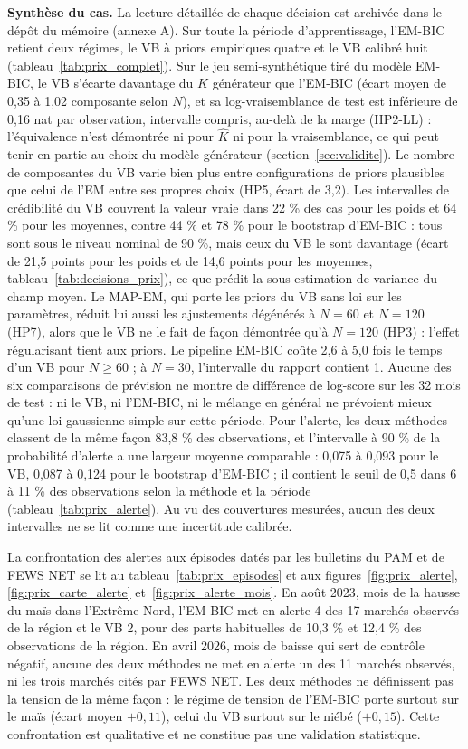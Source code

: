 \textbf{Synthèse du cas.} La lecture détaillée de chaque décision est archivée dans le dépôt du mémoire (annexe A). Sur toute la période d'apprentissage, l'EM-BIC retient deux régimes, le VB à priors empiriques quatre et le VB calibré huit (tableau~\ref{tab:prix_complet}). Sur le jeu semi-synthétique tiré du modèle EM-BIC, le VB s'écarte davantage du $K$ générateur que l'EM-BIC (écart moyen de 0,35 à 1,02 composante selon $N$), et sa log-vraisemblance de test est inférieure de 0,16 nat par observation, intervalle compris, au-delà de la marge (HP2-LL) : l'équivalence n'est démontrée ni pour $\hat K$ ni pour la vraisemblance, ce qui peut tenir en partie au choix du modèle générateur (section~\ref{sec:validite}). Le nombre de composantes du VB varie bien plus entre configurations de priors plausibles que celui de l'EM entre ses propres choix (HP5, écart de 3,2). Les intervalles de crédibilité du VB couvrent la valeur vraie dans 22 \% des cas pour les poids et 64 \% pour les moyennes, contre 44 \% et 78 \% pour le bootstrap d'EM-BIC : tous sont sous le niveau nominal de 90 \%, mais ceux du VB le sont davantage (écart de 21,5 points pour les poids et de 14,6 points pour les moyennes, tableau~\ref{tab:decisions_prix}), ce que prédit la sous-estimation de variance du champ moyen. Le MAP-EM, qui porte les priors du VB sans loi sur les paramètres, réduit lui aussi les ajustements dégénérés à $N = 60$ et $N = 120$ (HP7), alors que le VB ne le fait de façon démontrée qu'à $N = 120$ (HP3) : l'effet régularisant tient aux priors. Le pipeline EM-BIC coûte 2,6 à 5,0 fois le temps d'un VB pour $N \geq 60$ ; à $N = 30$, l'intervalle du rapport contient 1. Aucune des six comparaisons de prévision ne montre de différence de log-score sur les 32 mois de test : ni le VB, ni l'EM-BIC, ni le mélange en général ne prévoient mieux qu'une loi gaussienne simple sur cette période. Pour l'alerte, les deux méthodes classent de la même façon 83,8 \% des observations, et l'intervalle à 90 \% de la probabilité d'alerte a une largeur moyenne comparable : 0,075 à 0,093 pour le VB, 0,087 à 0,124 pour le bootstrap d'EM-BIC ; il contient le seuil de 0,5 dans 6 à 11 \% des observations selon la méthode et la période (tableau~\ref{tab:prix_alerte}). Au vu des couvertures mesurées, aucun des deux intervalles ne se lit comme une incertitude calibrée.

La confrontation des alertes aux épisodes datés par les bulletins du PAM et de FEWS NET se lit au tableau~\ref{tab:prix_episodes} et aux figures~\ref{fig:prix_alerte}, \ref{fig:prix_carte_alerte} et~\ref{fig:prix_alerte_mois}. En août 2023, mois de la hausse du maïs dans l'Extrême-Nord, l'EM-BIC met en alerte 4 des 17 marchés observés de la région et le VB 2, pour des parts habituelles de 10,3 \% et 12,4 \% des observations de la région. En avril 2026, mois de baisse qui sert de contrôle négatif, aucune des deux méthodes ne met en alerte un des 11 marchés observés, ni les trois marchés cités par FEWS NET. Les deux méthodes ne définissent pas la tension de la même façon : le régime de tension de l'EM-BIC porte surtout sur le maïs (écart moyen $+0{,}11$), celui du VB surtout sur le niébé ($+0{,}15$). Cette confrontation est qualitative et ne constitue pas une validation statistique.

